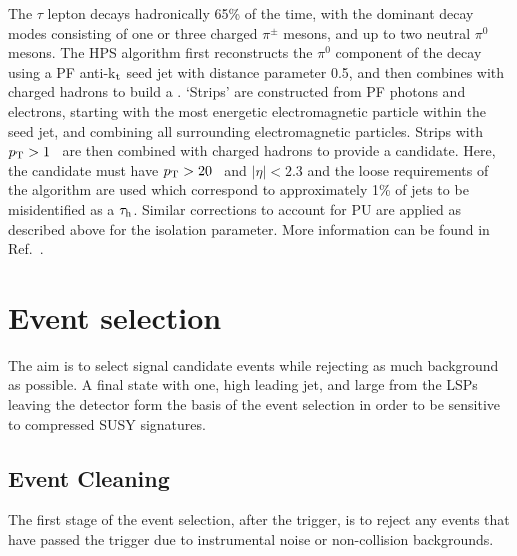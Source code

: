 The $\tau$ lepton decays hadronically 65\% of the time, with the dominant decay modes consisting of one or three charged $\pi^{\pm}$ mesons, and up to two neutral $\pi^{0}$ mesons.
The \ac{HPS} algorithm first reconstructs the $\pi^{0}$ component of the \tauh decay using a \ac{PF} anti-k$_{\rm t}$ seed jet with distance parameter 0.5, and then combines with charged hadrons to build a \tauh. 
`Strips' are constructed from \ac{PF} photons and electrons, starting with the most energetic electromagnetic particle within the seed jet, and combining all surrounding electromagnetic particles.
Strips with $p_{\text{T}} > 1$~\GeV{} are then combined with charged hadrons to provide a \tauh candidate. 
Here, the candidate must have $p_{\text{T}} > 20$~\GeV{} and $|\eta| < 2.3$ and the loose requirements of the algorithm are used which correspond to approximately 1\% of jets to be misidentified as a $\tau_\mathrm{h}$.
Similar corrections to account for \ac{PU} are applied as described above for the isolation parameter. 
More information can be found in Ref.~\cite{bib:HPStaus}. 



\section{Event selection}
\label{sec:ANA}

The aim is to select signal candidate events while rejecting as much background as possible.
A final state with one, high \pt leading jet, and large \MET from the LSPs leaving the detector form the basis of the event selection in order to be sensitive to compressed \ac{SUSY} signatures.

\subsection{Event Cleaning}

The first stage of the event selection, after the trigger, is to reject any events that have passed the trigger due to instrumental noise or non-collision backgrounds.


